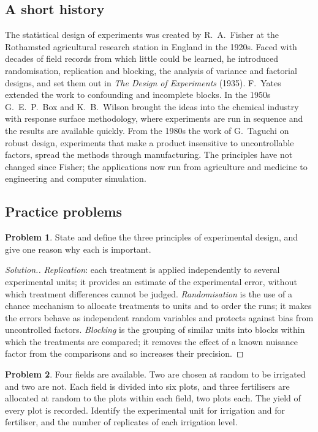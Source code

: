 \documentclass[11pt,a4paper]{article}
\numberwithin{equation}{section}
\theoremstyle{definition}
\newtheorem{problemx}{Problem}[subsection]
\newenvironment{problem}{\begin{problemx}}{\end{problemx}}
\newenvironment{solution}
  {\renewcommand{\qedsymbol}{}\begin{proof}[\textit{Solution}.]}
  {\end{proof}}
\begin{document}
\subsection{A short history}
The statistical design of experiments was created by R.~A.~Fisher at the Rothamsted agricultural research station in England in the 1920s.
Faced with decades of field records from which little could be learned, he introduced randomisation, replication and blocking, the analysis of
variance and factorial designs, and set them out in \emph{The Design of Experiments} (1935). F.~Yates extended the work to confounding and
incomplete blocks. In the 1950s G.~E.~P.~Box and K.~B.~Wilson brought the ideas into the chemical industry with response surface methodology,
where experiments are run in sequence and the results are available quickly. From the 1980s the work of G.~Taguchi on robust design,
experiments that make a product insensitive to uncontrollable factors, spread the methods through manufacturing. The principles have not
changed since Fisher; the applications now run from agriculture and medicine to engineering and computer simulation.

\subsection{Practice problems}

\begin{problem}
State and define the three principles of experimental design, and give one reason why each is important.
\end{problem}

\begin{solution}
\emph{Replication}: each treatment is applied independently to several experimental units; it provides an estimate of the experimental
error, without which treatment differences cannot be judged. \emph{Randomisation} is the use of a chance mechanism to allocate treatments to units and
to order the runs; it makes the errors behave as independent random variables and protects against bias from uncontrolled factors.
\emph{Blocking} is the grouping of similar units into blocks within which the treatments are compared; it removes the effect of a known nuisance
factor from the comparisons and so increases their precision.
\end{solution}

\begin{problem}
Four fields are available. Two are chosen at random to be irrigated and two are not. Each field is divided into six plots, and three fertilisers are
allocated at random to the plots within each field, two plots each. The yield of every plot is recorded. Identify the experimental unit for
irrigation and for fertiliser, and the number of replicates of each irrigation level.
\end{problem}
\end{document}

